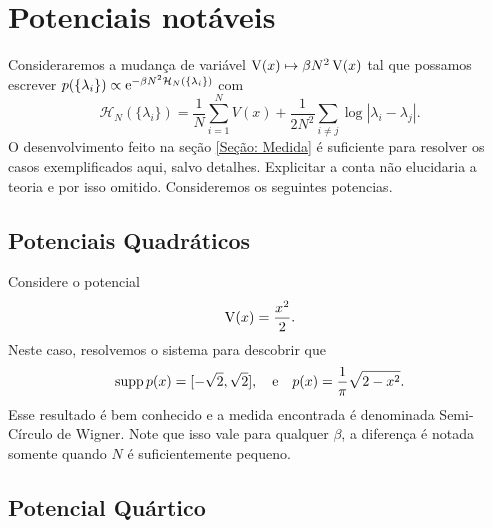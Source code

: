 \section{Potenciais notáveis}
\label{Section: Potencias}

Consideraremos a mudança de variável $\operatorname{V}(x) \mapsto \beta N^2 \operatorname{V}(x)$ tal que possamos escrever $p(\{ \lambda_i\}) \propto \operatorname{\textrm e}^{-\beta N^2 \mathcal{H}_N(\{ \lambda_i\})}$ com $$\mathcal{H}_N(\{ \lambda_i\}) = \frac{1}{N} \sum_{i = 1}^{N} V(x) + \frac{1}{2N^2} \sum_{i \neq j} \log{|\lambda_i - \lambda_j|}.$$ O desenvolvimento feito na seção \ref{Seção: Medida} é suficiente para resolver os casos exemplificados aqui, salvo detalhes. Explicitar a conta não elucidaria a teoria e por isso omitido. Consideremos os seguintes potencias.





\subsection{Potenciais Quadráticos}
Considere o potencial $$\operatorname{V}(x) = \frac{x^2}{2}.$$ Neste caso, resolvemos o sistema para descobrir que
\begin{equation}
	 \supp{\p(x)} = [-\sqrt{2}, \sqrt{2}], \ \ \ \text{e} \ \ \ \p(x) = \frac{1}{\pi} \sqrt{2 - x^2}.
	 \label{Equação: Quadrático}
\end{equation}
Esse resultado é bem conhecido e a medida encontrada é denominada Semi-Círculo de Wigner. Note que isso vale para qualquer $\beta$, a diferença é notada somente quando $N$ é suficientemente pequeno.

\subsection{Potencial Quártico}

